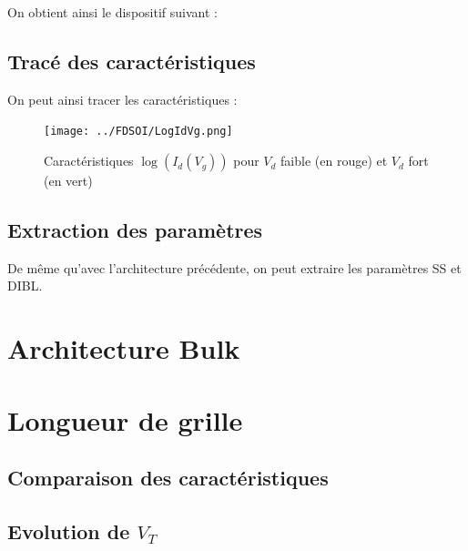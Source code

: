 \documentclass[a4paper,11pt]{report}
\begin{document}
On obtient ainsi le dispositif suivant :



\section{Tracé des caractéristiques}

On peut ainsi tracer les caractéristiques :
\begin{figure}[H]
    \centering
    \texttt{[image: ../FDSOI/LogIdVg.png]}
    \caption{Caractéristiques $\log(I_d(V_g))$ pour $V_d$ faible (en rouge) et $V_d$ fort (en vert)}    
\end{figure}


\section{Extraction des paramètres}

De même qu'avec l'architecture précédente, on peut extraire les paramètres SS et DIBL.


\chapter{Architecture Bulk}



\chapter{Longueur de grille}

\section{Comparaison des caractéristiques}

\section{Evolution de $V_T$}

\section{}
\end{document}
